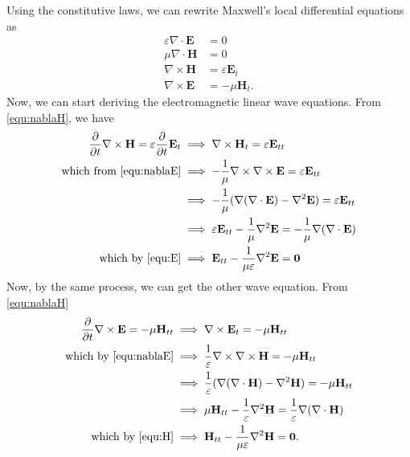 \documentclass[a4paper,12pt]{article}
\begin{document}
\begin{enumerate}[label = \arabic*.]
\begin{enumerate}[label = (\alph*)]
		Using the constitutive laws, we can rewrite Maxwell's local differential equations as
		\begin{align}
			\varepsilon \nabla \cdot \textbf{E} &= 0 \label{equ:E} \\
			\mu \nabla \cdot \textbf{H} &= 0 \label{equ:H} \\
			\nabla \times \textbf{H} &= \varepsilon \textbf{E}_t\label{equ:nablaH}\\
			\nabla \times \textbf{E} &= -\mu \textbf{H}_t \label{equ:nablaE}.
		\end{align}
		Now, we can start deriving the electromagnetic linear wave equations. From \eqref{equ:nablaH}, we have
		\begin{align*}
			\frac{\partial}{\partial t} \nabla \times \textbf{H} = \varepsilon \frac{\partial}{\partial t} \textbf{E}_t &\implies \nabla \times \textbf{H}_{t} = \varepsilon\textbf{E}_{tt} \\
			\text{which from \eqref{equ:nablaE}} &\implies -\frac{1}{\mu} \nabla \times \nabla \times \textbf{E} = \varepsilon \textbf{E}_{tt} \\
			&\implies -\frac{1}{\mu}(\nabla (\nabla \cdot \textbf{E}) - \nabla^2 \textbf{E}) = \varepsilon \textbf{E}_{tt} \\
			&\implies \varepsilon \textbf{E}_{tt} - \frac{1}{\mu} \nabla^2 \textbf{E} = -\frac{1}{\mu} \nabla (\nabla \cdot \textbf{E}) \\
			\text{which by \eqref{equ:E}} &\implies \textbf{E}_{tt} - \frac{1}{\mu \varepsilon} \nabla^2 \textbf{E} = \textbf{0}
		\end{align*}
		Now, by the same process, we can get the other wave equation. From \eqref{equ:nablaH}
		\begin{align*}
			\frac{\partial}{\partial t} \nabla \times \textbf{E} = -\mu \textbf{H}_{tt} &\implies \nabla \times \textbf{E}_t = -\mu \textbf{H}_{tt} \\
			\text{which by \eqref{equ:nablaE}} &\implies \frac{1}{\varepsilon} \nabla \times \nabla \times \textbf{H} = -\mu \textbf{H}_{tt} \\
			&\implies \frac{1}{\varepsilon}(\nabla (\nabla \cdot \textbf{H}) - \nabla^2\textbf{H}) = -\mu \textbf{H}_{tt}\\
			&\implies \mu \textbf{H}_{tt} - \frac{1}{\varepsilon} \nabla^2 \textbf{H} = \frac{1}{\varepsilon}\nabla (\nabla \cdot \textbf{H}) \\
			\text{which by \eqref{equ:H}} &\implies \textbf{H}_{tt} - \frac{1}{\mu \varepsilon} \nabla^2 \textbf{H} = \textbf{0}.
		\end{align*}

\end{enumerate}
\end{enumerate}
\end{document}
